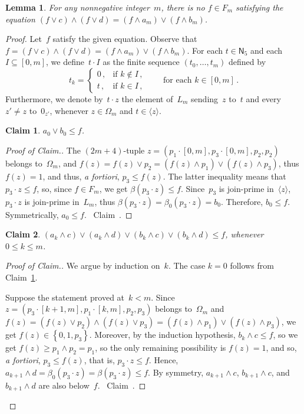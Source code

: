 \documentclass[reqno]{amsart}
\numberwithin{equation}{section}
\theoremstyle{plain}
\newtheorem{lemma}[theorem]{Lemma}
\newtheorem{claim}{Claim}
\theoremstyle{definition}
\theoremstyle{remark}
\newenvironment{cproof}
{\begin{proof}[Proof of Claim.]}
{{{}~{\rm Claim~{\theclaim}.}}\end{proof}}
\numberwithin{figure}{section}
\numberwithin{table}{section}
\begin{document}
\begin{lemma}\label{L:NoMidFm}
For any nonnegative integer~$m$, there is no $f\in F_m$ satisfying the equation $(f\vee c)\wedge(f\vee d)=(f\wedge a_m)\vee(f\wedge b_m)$.
\end{lemma}

\begin{proof}
Let~$f$ satisfy the given equation.
Observe that $f=(f\vee c)\wedge(f\vee d)=(f\wedge a_m)\vee(f\wedge b_m)$.
For each $t\in{{\mathsf{N}}}_5$ and each $I\subseteq[0,m]$, we define~$t\cdot I$ as the finite sequence $(t_0,\dots,t_m)$ defined by
 \[
 t_k=\begin{cases}
 0\,,&\text{if }k\notin I\,,\\
 t\,,&\text{if }k\in I\,,
 \end{cases}
 \qquad\text{for each }k\in[0,m]\,.
 \]
Furthermore, we denote by~$t\cdot z$ the element of~$L_m$ sending~$z$ to~$t$ and every $z'\neq z$ to~$0_{z'}$, whenever $z\in{\Omega}_m$ and $t\in{\langle{{z}}\rangle}$.

\setcounter{claim}{0}

\begin{claim}\label{Cl:a0jjb0leqf}
$a_0\vee b_0\leq f$.
\end{claim}

\begin{cproof}
The $(2m+4)$-tuple $z=(p_1\cdot[0,m],p_3\cdot[0,m],p_2,p_2)$ belongs to~${\Omega}_m$, and $f(z)=f(z)\vee p_2=(f(z)\wedge p_1)\vee(f(z)\wedge p_3)$, thus $f(z)=1$, and thus, \emph{a fortiori}, $p_3\leq f(z)$.
The latter inequality means that $p_3\cdot z\leq f$, so, since $f\in F_m$, we get $\beta(p_3\cdot z)\leq f$.
Since~$p_3$ is join-prime in~${\langle{{z}}\rangle}$, $p_3\cdot z$ is join-prime in~$L_m$, thus $\beta(p_3\cdot z)=\beta_0(p_3\cdot z)=b_0$.
Therefore, $b_0\leq f$.
Symmetrically, $a_0\leq f$.
\end{cproof}

\begin{claim}\label{Cl:akcleqf}
$(a_k\wedge c)\vee(a_k\wedge d)\vee(b_k\wedge c)\vee(b_k\wedge d)\leq f$,
whenever $0\leq k\leq m$.
\end{claim}

\begin{cproof}
We argue by induction on~$k$.
The case $k=0$ follows from Claim~\ref{Cl:a0jjb0leqf}.

Suppose the statement proved at~$k<m$.
Since $z=(p_3\cdot[k+1,m],p_1\cdot[k,m],p_2,p_3)$ belongs to~${\Omega}_m$ and $f(z)=(f(z)\vee p_2)\wedge(f(z)\vee p_3)=(f(z)\wedge p_1)\vee(f(z)\wedge p_3)$, we get $f(z)\in{\left\{{0,1,p_3}\right\}}$.
Moreover, by the induction hypothesis, $b_k\wedge c\leq f$, so we get $f(z)\geq p_1\wedge p_2=p_1$, so the only remaining possibility is $f(z)=1$, and so, \emph{a fortiori}, $p_3\leq f(z)$, that is, $p_3\cdot z\leq f$.
Hence, $a_{k+1}\wedge d=\beta_0(p_3\cdot z)=\beta(p_3\cdot z)\leq f$.
By symmetry, $a_{k+1}\wedge c$, $b_{k+1}\wedge c$, and $b_{k+1}\wedge d$ are also below~$f$.
\end{cproof}


\end{proof}
\end{document}
